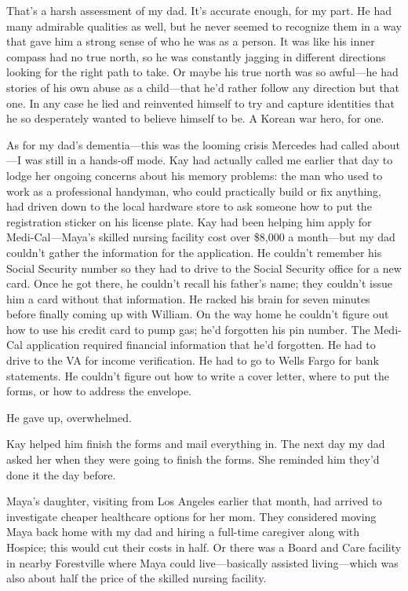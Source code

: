 \documentclass[12pt]{book}
\begin{document}
That's a harsh assessment of my dad. It's accurate enough, for my part. He had many admirable qualities as well, but he never seemed to recognize them in a way that gave him a strong sense of who he was as a person. It was like his inner compass had no true north, so he was constantly jagging in different directions looking for the right path to take. Or maybe his true north was so awful---he had stories of his own abuse as a child---that he'd rather follow any direction but that one. In any case he lied and reinvented himself to try and capture identities that he so desperately wanted to believe himself to be. A Korean war hero, for one.

As for my dad's dementia---this was the looming crisis Mercedes had called about---I was still in a hands-off mode. Kay had actually called me earlier that day to lodge her ongoing concerns about his memory problems: the man who used to work as a professional handyman, who could practically build or fix anything, had driven down to the local hardware store to ask someone how to put the registration sticker on his license plate. Kay had been helping him apply for Medi-Cal---Maya's skilled nursing facility cost over \$8,000 a month---but my dad couldn't gather the information for the application. He couldn't remember his Social Security number so they had to drive to the Social Security office for a new card. Once he got there, he couldn't recall his father's name; they couldn't issue him a card without that information. He racked his brain for seven minutes before finally coming up with William. On the way home he couldn't figure out how to use his credit card to pump gas; he'd forgotten his pin number. The Medi-Cal application required financial information that he'd forgotten. He had to drive to the VA for income verification. He had to go to Wells Fargo for bank statements. He couldn't figure out how to write a cover letter, where to put the forms, or how to address the envelope.

He gave up, overwhelmed.

Kay helped him finish the forms and mail everything in. The next day my dad asked her when they were going to finish the forms. She reminded him they'd done it the day before.

Maya's daughter, visiting from Los Angeles earlier that month, had arrived to investigate cheaper healthcare options for her mom. They considered moving Maya back home with my dad and hiring a full-time caregiver along with Hospice; this would cut their costs in half. Or there was a Board and Care facility in nearby Forestville where Maya could live---basically assisted living---which was also about half the price of the skilled nursing facility.
\end{document}
